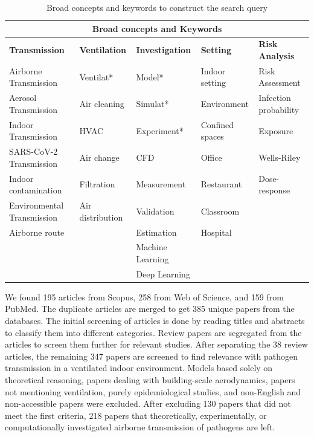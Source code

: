 \documentclass[a4paper,12pt]{elsarticle}
\begin{document}
{\renewcommand{\arraystretch}{1.1}
\begin{table}
    \begin{tabularx}{\textwidth}{|p{2.5cm}|X|p{2.5cm}|X|X|}
    \hline
    \multicolumn{5}{|c|}{\textbf{Broad concepts and Keywords}} \\
    \hline
    \textbf{Transmission} & \textbf{Ventilation} & \textbf{Investigation} & \textbf{Setting} & \textbf{Risk Analysis}\\
    \hline
    Airborne Transmission & Ventilat* & Model* & Indoor setting & Risk Assessment \\
    Aerosol Transmission & Air cleaning & Simulat* & Environment & Infection probability\\
    Indoor Transmission & HVAC & Experiment* & Confined spaces & Exposure \\         
    SARS-CoV-2 Transmission & Air change  & CFD & Office  & Wells-Riley\\        
    Indoor contamination & Filtration & Measurement & Restaurant & Dose-response\\        
    Environmental Transmission & Air distribution & Validation & Classroom & \\  
    Airborne route &  & Estimation & Hospital & \\
     &  & Machine Learning &  & \\
    &  & Deep Learning &  & \\
    \hline
    \end{tabularx}
    \caption{Broad concepts and keywords to construct the search query}
    \label{tab:keys}
\end{table}
}

We found 195 articles from Scopus, 258 from Web of Science, and 159 from PubMed. The duplicate articles are merged to get 385 unique papers from the databases. The initial screening of articles is done by reading titles and abstracts to classify them into different categories. Review papers are segregated from the articles to screen them further for relevant studies. After separating the 38 review articles, the remaining 347 papers are screened to find relevance with pathogen transmission in a ventilated indoor environment. Models based solely on theoretical reasoning, papers dealing with building-scale aerodynamics, papers not mentioning ventilation, purely epidemiological studies, and non-English and non-accessible papers were excluded. After excluding 130 papers that did not meet the first criteria, 218 papers that theoretically, experimentally, or computationally investigated airborne transmission of pathogens are left.
\end{document}
